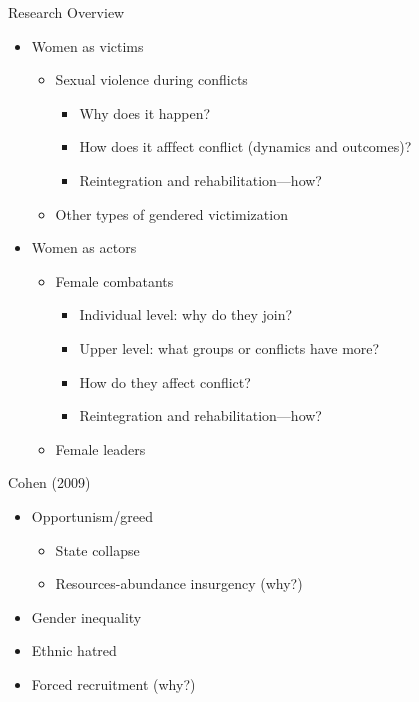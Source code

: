 \documentclass[handout]{beamer}
\begin{document}
\begin{frame}{Research Overview}
    \begin{itemize}
        \pause\item Women as victims
        \begin{itemize}
            \pause\item Sexual violence during conflicts
            \begin{itemize}
                \pause\item Why does it happen?
                \pause\item How does it afffect conflict (dynamics and outcomes)?
                \pause\item Reintegration and rehabilitation---how?
            \end{itemize}
            \pause\item Other types of gendered victimization
        \end{itemize}
        \pause\item Women as actors
        \begin{itemize}
            \pause\item Female combatants
            \begin{itemize}
                \pause\item Individual level: why do they join?
                \pause\item Upper level: what groups or conflicts have more?
                \pause\item How do they affect conflict?
                \pause\item Reintegration and rehabilitation---how?
            \end{itemize}
            \pause\item Female leaders
        \end{itemize}
    \end{itemize}
\end{frame}

\begin{frame}{Cohen (2009)}
    \begin{itemize}
        \pause\item Opportunism/greed
        \begin{itemize}
            \pause\item State collapse
            \pause\item Resources-abundance insurgency (why?)
        \end{itemize}
        \pause\item Gender inequality
        \pause\item Ethnic hatred
        \pause\item Forced recruitment (why?)
    \end{itemize}
\end{frame}
\end{document}
